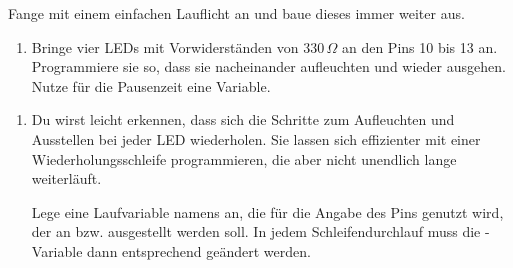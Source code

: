 \begin{aufgabe}
	Fange mit einem einfachen Lauflicht an und baue dieses immer weiter aus.
	\begin{enumerate}[label=\alph*), itemsep=0ex, parsep=0ex]
		\item Bringe vier LEDs mit Vorwiderständen von $330\,\Omega$ an den Pins 10 bis 13 an. Programmiere sie so, dass sie nacheinander aufleuchten und wieder ausgehen. Nutze für die Pausenzeit eine Variable.
	\end{enumerate}
	\begin{minipage}{0.76\textwidth}
		\begin{enumerate}[label=\alph*), itemsep=0ex, parsep=0ex,start=2]
			\item Du wirst leicht erkennen, dass sich die Schritte zum Aufleuchten und Ausstellen bei jeder LED wiederholen. Sie lassen sich effizienter mit einer Wiederholungsschleife programmieren, die aber nicht unendlich lange weiterläuft. 
			
			Lege eine Laufvariable namens  an, die für die Angabe des Pins genutzt wird, der an bzw. ausgestellt werden soll. In jedem Schleifendurchlauf muss die -Variable dann entsprechend geändert werden.
			

\end{enumerate}
\end{minipage}
\end{aufgabe}
